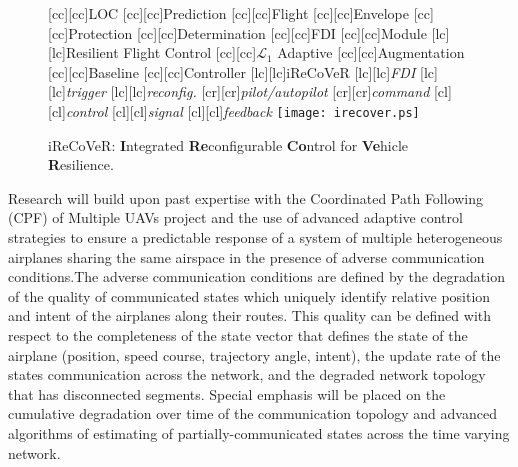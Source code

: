 \documentclass[letter,onecolumn,12pt]{aiaa-tc}
\newcommand{\Lone}{\mathcal{L}_1}
\begin{document}
\begin{figure}
\centering

[cc][cc]{{\sf LOC}}
[cc][cc]{{\sf Prediction}}
%
[cc][cc]{{\sf Flight}}
[cc][cc]{{\sf Envelope}}
[cc][cc]{{\sf Protection}}
[cc][cc]{{\sf Determination}}
%
[cc][cc]{{\sf FDI}}
[cc][cc]{{\sf Module}}
%
[lc][lc]{{\sf Resilient Flight Control}}
[cc][cc]{{\sf $\Lone$ Adaptive}}
[cc][cc]{{\sf Augmentation}}
[cc][cc]{{\sf Baseline}}
[cc][cc]{{\sf Controller}}
%
[lc][lc]{{\sf iReCoVeR}}
%
[lc][lc]{{\sf \it FDI}}
[lc][lc]{{\sf \it trigger}}
%
[lc][lc]{{\sf \it reconfig.}}
%
[cr][cr]{{\sf \it pilot/autopilot}}
[cr][cr]{{\sf \it command}}
[cl][cl]{{\sf \it control}}
[cl][cl]{{\sf \it signal}}
[cl][cl]{{\sf \it feedback}}
%
\vspace{-4mm}
\texttt{[image: irecover.ps]}
\caption*{\footnotesize iReCoVeR: \textbf{I}ntegrated \textbf{Re}configurable \textbf{Co}ntrol for \textbf{Ve}hicle \textbf{R}esilience.}
\label{fig:IReCoVeR}
\end{figure}

\vspace{-1mm}
Research will build upon past expertise with the Coordinated Path Following (CPF) of Multiple UAVs project and the use of advanced adaptive control strategies to ensure a predictable response of a system of multiple heterogeneous airplanes sharing the same airspace in the presence of adverse communication conditions.The adverse communication conditions are defined by the degradation of the quality of communicated states which uniquely identify relative position and intent of the airplanes along their routes. This quality can be defined with respect to the completeness of the state vector that defines the state of the airplane (position, speed course, trajectory angle, intent), the update rate of the states communication across the network, and the degraded network topology that has disconnected segments. Special emphasis will be placed on the cumulative degradation over time of the communication topology and advanced algorithms of estimating of partially-communicated states across the time varying network.
\end{document}
